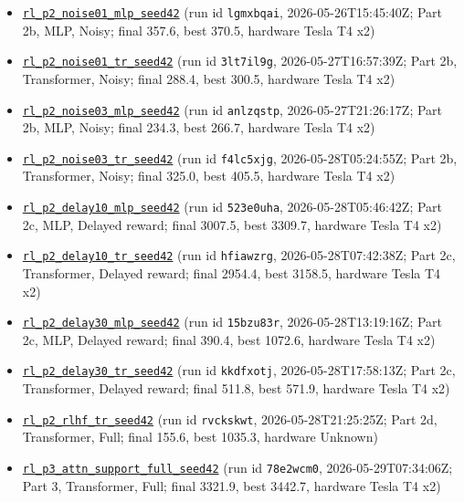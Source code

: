 \documentclass[11pt]{article}
\begin{document}
\begin{itemize}
\item \href{https://wandb.ai/krishsachdev246-bits-pilani/saidl-rl/runs/lgmxbqai}{\texttt{rl\_p2\_noise01\_mlp\_seed42}} (run id \texttt{lgmxbqai}, 2026-05-26T15:45:40Z; Part 2b, MLP, Noisy; final 357.6, best 370.5, hardware Tesla T4 x2)
\item \href{https://wandb.ai/krishsachdev246-bits-pilani/saidl-rl/runs/3lt7il9g}{\texttt{rl\_p2\_noise01\_tr\_seed42}} (run id \texttt{3lt7il9g}, 2026-05-27T16:57:39Z; Part 2b, Transformer, Noisy; final 288.4, best 300.5, hardware Tesla T4 x2)
\item \href{https://wandb.ai/krishsachdev246-bits-pilani/saidl-rl/runs/anlzqstp}{\texttt{rl\_p2\_noise03\_mlp\_seed42}} (run id \texttt{anlzqstp}, 2026-05-27T21:26:17Z; Part 2b, MLP, Noisy; final 234.3, best 266.7, hardware Tesla T4 x2)
\item \href{https://wandb.ai/krishsachdev246-bits-pilani/saidl-rl/runs/f4lc5xjg}{\texttt{rl\_p2\_noise03\_tr\_seed42}} (run id \texttt{f4lc5xjg}, 2026-05-28T05:24:55Z; Part 2b, Transformer, Noisy; final 325.0, best 405.5, hardware Tesla T4 x2)
\item \href{https://wandb.ai/krishsachdev246-bits-pilani/saidl-rl/runs/523e0uha}{\texttt{rl\_p2\_delay10\_mlp\_seed42}} (run id \texttt{523e0uha}, 2026-05-28T05:46:42Z; Part 2c, MLP, Delayed reward; final 3007.5, best 3309.7, hardware Tesla T4 x2)
\item \href{https://wandb.ai/krishsachdev246-bits-pilani/saidl-rl/runs/hfiawzrg}{\texttt{rl\_p2\_delay10\_tr\_seed42}} (run id \texttt{hfiawzrg}, 2026-05-28T07:42:38Z; Part 2c, Transformer, Delayed reward; final 2954.4, best 3158.5, hardware Tesla T4 x2)
\item \href{https://wandb.ai/krishsachdev246-bits-pilani/saidl-rl/runs/15bzu83r}{\texttt{rl\_p2\_delay30\_mlp\_seed42}} (run id \texttt{15bzu83r}, 2026-05-28T13:19:16Z; Part 2c, MLP, Delayed reward; final 390.4, best 1072.6, hardware Tesla T4 x2)
\item \href{https://wandb.ai/krishsachdev246-bits-pilani/saidl-rl/runs/kkdfxotj}{\texttt{rl\_p2\_delay30\_tr\_seed42}} (run id \texttt{kkdfxotj}, 2026-05-28T17:58:13Z; Part 2c, Transformer, Delayed reward; final 511.8, best 571.9, hardware Tesla T4 x2)
\item \href{https://wandb.ai/krishsachdev246-bits-pilani/saidl-rl/runs/rvckskwt}{\texttt{rl\_p2\_rlhf\_tr\_seed42}} (run id \texttt{rvckskwt}, 2026-05-28T21:25:25Z; Part 2d, Transformer, Full; final 155.6, best 1035.3, hardware Unknown)
\item \href{https://wandb.ai/krishsachdev246-bits-pilani/saidl-rl/runs/78e2wcm0}{\texttt{rl\_p3\_attn\_support\_full\_seed42}} (run id \texttt{78e2wcm0}, 2026-05-29T07:34:06Z; Part 3, Transformer, Full; final 3321.9, best 3442.7, hardware Tesla T4 x2)

\end{itemize}
\end{document}
